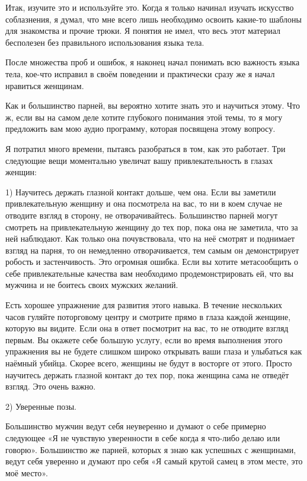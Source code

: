 Итак, изучите это и используйте это. Когда я только начинал изучать искусство соблазнения, я думал, что мне всего лишь необходимо освоить какие-то шаблоны для знакомства и прочие трюки. Я понятия не имел, что весь этот материал бесполезен без правильного использования языка тела.

После множества проб и ошибок, я наконец начал понимать всю важность языка тела, кое-что исправил в своём поведении и практически сразу же я начал нравиться женщинам.

Как и большинство парней, вы вероятно хотите знать это и научиться этому. Что ж, если вы на самом деле хотите глубокого понимания этой темы, то я могу предложить вам мою аудио программу, которая посвящена этому вопросу.

Я потратил много времени, пытаясь разобраться в том, как это работает. Три следующие вещи моментально увеличат вашу привлекательность в глазах женщин:

1) Научитесь держать глазной контакт дольше, чем она. Если вы заметили привлекательную женщину и она посмотрела на вас, то ни в коем случае не отводите взгляд в сторону, не отворачивайтесь. Большинство парней могут смотреть на привлекательную женщину до тех пор, пока она не заметила, что за ней наблюдают. Как только она почувствовала, что на неё смотрят и поднимает взгляд на парня, то он немедленно отворачивается, тем самым он демонстрирует робость и застенчивость. Это огромная ошибка. Если вы хотите метасообщить о себе привлекательные качества вам необходимо продемонстрировать ей, что вы мужчина и не боитесь своих мужских желаний.

Есть хорошее упражнение для развития этого навыка. В течение нескольких часов гуляйте поторговому центру и смотрите прямо в глаза каждой женщине, которую вы видите. Если она в ответ посмотрит на вас, то не отводите взгляд первым. Вы окажете себе большую услугу, если во время выполнения этого упражнения вы не будете слишком широко открывать ваши глаза и улыбаться как наёмный убийца. Скорее всего, женщины не будут в восторге от этого. Просто научитесь держать глазной контакт до тех пор, пока женщина сама не отведёт взгляд. Это очень важно.

2) Уверенные позы.

Большинство мужчин ведут себя неуверенно и думают о себе примерно следующее «Я не чувствую уверенности в себе когда я что-либо делаю или говорю». Большинство же парней, которых я знаю как успешных с женщинами, ведут себя уверенно и думают про себя «Я самый крутой самец в этом месте, это моё место».

